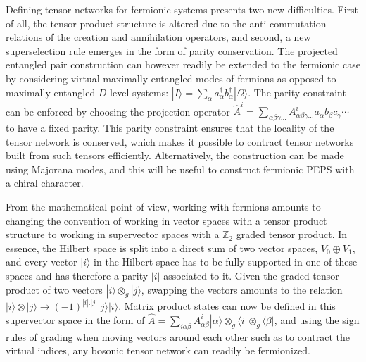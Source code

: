 \documentclass[rmp,aps,reprint,superscriptaddress,nobalancelastpage]{revtex4-1}
\begin{document}
Defining tensor networks for fermionic systems presents two new difficulties. First of all, the tensor product structure is altered due to the anti-commutation relations of the creation and annihilation operators, and second, a new superselection rule emerges in the form of parity conservation.  The projected entangled pair construction can  however readily be extended to the fermionic case by considering virtual maximally entangled modes of fermions as opposed to maximally entangled $D$-level systems: $|I\rangle=\sum_{\alpha}a_\alpha^\dagger b_\alpha^\dagger|\Omega\rangle$. The parity constraint can be enforced by choosing the projection operator $\hat{A}^i=\sum_{\alpha\beta\gamma\ldots}A^i_{\alpha\beta\gamma\ldots}a_\alpha b_\beta c_\gamma \cdots$ to have a fixed parity. This parity constraint ensures that the locality of the tensor network is conserved, which makes it possible to contract tensor networks built from such tensors efficiently. Alternatively, the construction can be made using Majorana modes, and this will be useful to construct fermionic PEPS with a chiral character.

From the mathematical point of view, working with fermions amounts to
changing the convention of working in vector spaces with a tensor product
structure to working in supervector spaces with a $\mathbb{Z}_2$ graded
tensor product. In essence, the Hilbert space is split into a direct sum
of two vector spaces, $V_0\oplus V_1$, and every vector $|i\rangle$ in the
Hilbert space has to be fully supported in one of these spaces and has
therefore a parity $|i|$ associated to it. Given the graded tensor product
of two vectors $|i\rangle\otimes_g|j\rangle$, swapping the vectors amounts
to the relation $|i\rangle\otimes|j\rangle\rightarrow
    (-1)^{|i|.|j|}|j\rangle|i\rangle$. Matrix product states can now be
defined in this supervector space \cite{bultinck:fermionic-mps-phases} in the form of $\hat{A}=\sum_{i\alpha\beta}A^i_{\alpha\beta}|\alpha\rangle\otimes_g\langle i|\otimes_g\langle\beta|$, and using the sign rules of grading when moving vectors around each other such as to contract the virtual indices,  any bosonic tensor network can readily be fermionized.
\end{document}
